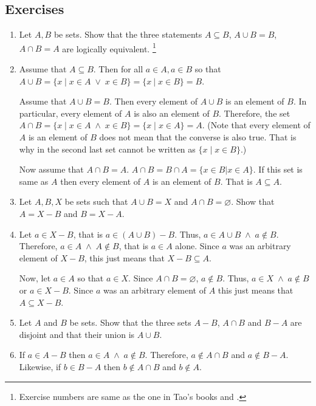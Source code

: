 \subsection{Exercises}
\begin{enumerate}
\item[Ex 3.1.5 ] Let $A, B$ be sets. Show that the three statements $A
\subseteq B$, $A \cup B = B$, $A \cap B = A$ are logically equivalent.
\footnote{Exercise numbers are same as the one in Tao's books 
\cite{tao2014a1} and \cite{tao2014a2}.}
\item[Solution: ] Assume that $A \subseteq B$. Then for all $a \in A, a
\in B$ so that $A \cup B = \{x \;|\; x \in A \;\lor\; x \in B\} = 
\{x \:|\; x \in B\} = B$.

Assume that $A \cup B = B$. Then every element of $A \cup B$ is an element
of $B$. In particular, every element of $A$ is also an element of $B$. 
Therefore, the set $A \cap B = \{x \;|\; x \in A \;\land\; x \in B\} = 
\{x \;|\; x \in A\} = A$. (Note that every element of $A$ is an element of
$B$ does not mean that the converse is also true. That is why in the
second last set cannot be written as $\{x \;|\; x \in B\}$.)

Now assume that $A \cap B = A$. $A \cap B = B \cap A = \{x \in B | x \in
A\}$. If this set is same as $A$ then every element of $A$ is an element
of $B$. That is $A \subseteq A$.

\item[Ex 3.1.9 ] Let $A, B, X$ be sets such that $A \cup B = X$ and $A
\cap B = \varnothing$. Show that $A = X - B$ and $B = X - A$.
\item[Solution: ] Let $a \in X - B$, that is $a \in (A \cup B) - B$. Thus,
$a \in A \cup B \;\land\; a \notin B$. Therefore, $a \in A \;\land\; A 
\notin B$, that is $a \in A$ alone. Since $a$ was an arbitrary element
of $X - B$, this just means that $X - B \subseteq A$.

Now, let $a \in A$ so that $a \in X$. Since $A \cap B = \varnothing$, $a
\notin B$. Thus, $a \in X \;\land\; a \notin B$ or $a \in X - B$. Since
$a$ was an arbitrary element of $A$ this just means that $A \subseteq X -
B$.

\item[Ex 3.1.10 ] Let $A$ and $B$ be sets. Show that the three sets $A - B$,
$A \cap B$ and $B - A$ are disjoint and that their union is $A \cup B$.
\item[Solution: ] If $a \in A - B$ then $a \in A \;\land\; a \notin B$. 
Therefore, $a \notin A \cap B$ and $a \notin B - A$. Likewise, if $b \in
B - A$ then $b \notin A \cap B$ and $b \notin A$.


\end{enumerate}
